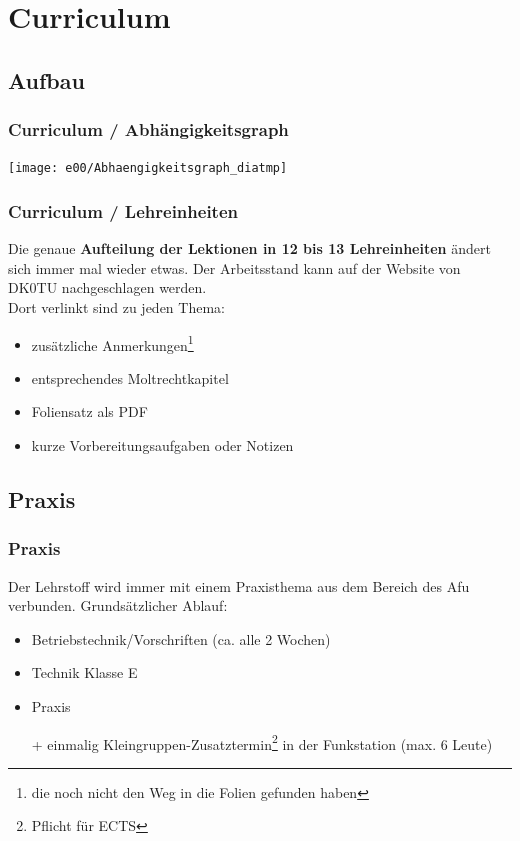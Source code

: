 \section{Curriculum}

\subsection{Aufbau}

\begin{frame}
    \frametitle{Curriculum / Abhängigkeitsgraph}

    \texttt{[image: e00/Abhaengigkeitsgraph\_diatmp]}

\end{frame}

\begin{frame}
    \frametitle{Curriculum / Lehreinheiten}

    Die genaue \textbf{Aufteilung der Lektionen in 12 bis 13 Lehreinheiten}
    ändert sich immer mal wieder etwas. Der Arbeitsstand kann auf der Website
    von DK0TU\hyperlink{refs}{\cite{curr}} nachgeschlagen werden. \\[2em]

    Dort verlinkt sind zu jeden Thema:

    \begin{itemize}
        \item zusätzliche Anmerkungen\footnote{die noch nicht den Weg in die
              Folien gefunden haben}
        \item entsprechendes Moltrechtkapitel
        \item Foliensatz als PDF
        \item kurze Vorbereitungsaufgaben oder Notizen
    \end{itemize}

\end{frame}

\subsection{Praxis}

\begin{frame}
  \frametitle{Praxis}

    Der Lehrstoff wird immer mit einem Praxisthema aus dem Bereich des Afu
    verbunden. Grundsätzlicher Ablauf:

    \begin{itemize}
      \item Betriebstechnik/Vorschriften (ca. alle 2 Wochen)
      \item Technik Klasse E
      \item Praxis
      \item[+] einmalig Kleingruppen-Zusatztermin\footnote{Pflicht für ECTS} in der
        Funkstation (max. 6 Leute)
    \end{itemize}

\end{frame}

